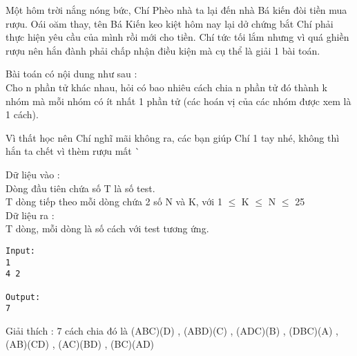 



   Một hôm trời nắng nóng bức, Chí Phèo nhà ta lại đến nhà Bá kiến đòi tiền mua rượu. Oái oăm thay, tên Bá Kiến keo kiệt hôm nay lại dở chứng bắt Chí phải thực hiện yêu cầu của mình rồi mới cho tiền. Chí tức tối lắm nhưng vì quá ghiền rượu nên hắn đành phải chấp nhận điều kiện mà cụ thể là giải 1 bài toán.  

   Bài toán có nội dung như sau :   
\\   Cho n phần tử khác nhau, hỏi có bao nhiêu cách chia n phần tử đó thành k nhóm mà mỗi nhóm có ít nhất 1 phần tử (các hoán vị của các nhóm được xem là 1 cách).  

   Vì thất học nên Chí nghĩ mãi không ra, các bạn giúp Chí 1 tay nhé, không thì hắn ta chết vì thèm rượu mất ^^  

       Dữ liệu vào :      
\\   Dòng đầu tiên chứa số T là số test.   
\\   T dòng tiếp theo mỗi dòng chứa 2 số N và K, với 1 $\le$ K $\le$ N $\le$ 25   
\\       Dữ liệu ra :      
\\   T dòng, mỗi dòng là số cách với test tương ứng.  
\begin{verbatim}
Input:
1
4 2

Output:
7
\end{verbatim}

   Giải thích : 7 cách chia đó là (ABC)(D) , (ABD)(C) , (ADC)(B) , (DBC)(A) , (AB)(CD) , (AC)(BD) , (BC)(AD)  
